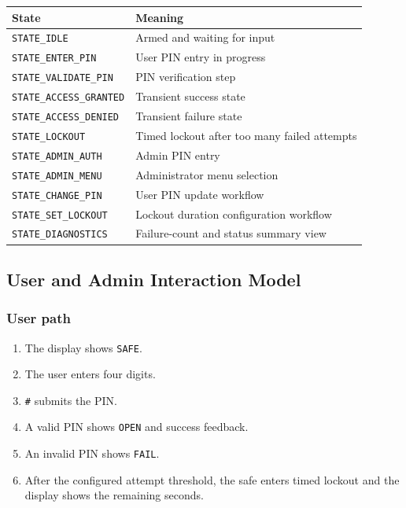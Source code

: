 \documentclass[11pt,a4paper]{article}
\begin{document}
\begin{tabularx}{\textwidth}{l X}
\toprule
\textbf{State} & \textbf{Meaning} \\
\midrule
\texttt{STATE\_IDLE} & Armed and waiting for input \\
\texttt{STATE\_ENTER\_PIN} & User PIN entry in progress \\
\texttt{STATE\_VALIDATE\_PIN} & PIN verification step \\
\texttt{STATE\_ACCESS\_GRANTED} & Transient success state \\
\texttt{STATE\_ACCESS\_DENIED} & Transient failure state \\
\texttt{STATE\_LOCKOUT} & Timed lockout after too many failed attempts \\
\texttt{STATE\_ADMIN\_AUTH} & Admin PIN entry \\
\texttt{STATE\_ADMIN\_MENU} & Administrator menu selection \\
\texttt{STATE\_CHANGE\_PIN} & User PIN update workflow \\
\texttt{STATE\_SET\_LOCKOUT} & Lockout duration configuration workflow \\
\texttt{STATE\_DIAGNOSTICS} & Failure-count and status summary view \\
\bottomrule
\end{tabularx}

\subsection{User and Admin Interaction Model}

\subsubsection*{User path}

\begin{enumerate}[leftmargin=1.7em]
\item The display shows \texttt{SAFE}.
\item The user enters four digits.
\item \texttt{\#} submits the PIN.
\item A valid PIN shows \texttt{OPEN} and success feedback.
\item An invalid PIN shows \texttt{FAIL}.
\item After the configured attempt threshold, the safe enters timed lockout and the display shows the remaining seconds.
\end{enumerate}
\end{document}
